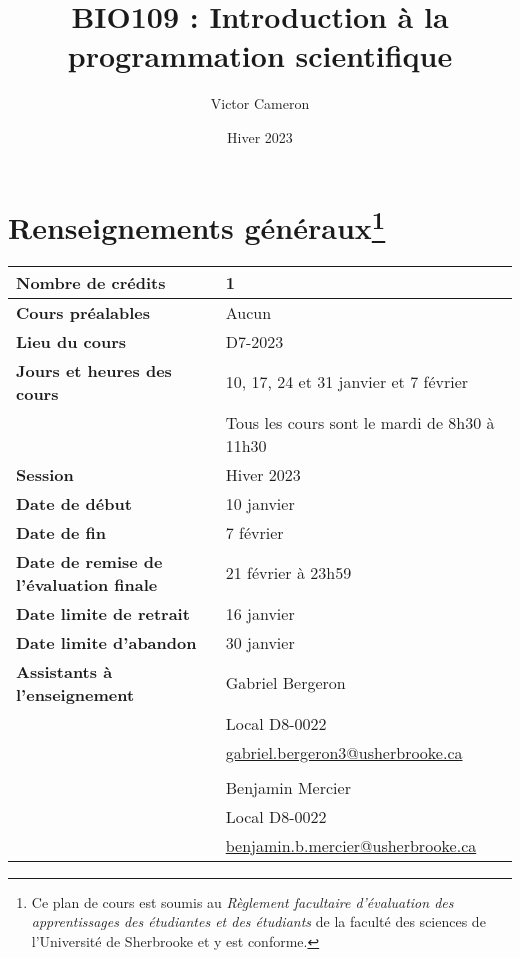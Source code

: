 \documentclass[12]{article}
\title{BIO109 : Introduction à la programmation scientifique}
\date {Hiver 2023}
\author {Victor Cameron}
\affil {Département de biologie \\
Université de Sherbrooke \\
Local D8-0012 \\
819-821-8000 \#61928}
\affil {\url{victor.cameron@usherbrooke.ca}}
\begin{document}
	\maketitle

	\section*{Renseignements généraux\footnote{Ce plan de cours est soumis au \textit{Règlement facultaire d'évaluation des apprentissages des étudiantes et des étudiants} de la faculté des sciences de l'Université de Sherbrooke et y est conforme.}} 
        
        \begin{center}
        \begin{tabular}{ m{22em} m{24em} } 
         \hline
         \hline
         \textbf{Nombre de crédits} & 1 \\ 
         \hline
         \textbf{Cours préalables} & Aucun \\
         \hline
         \textbf{Lieu du cours} & D7-2023 \\
         \hline
         \textbf{Jours et heures des cours} & 10, 17, 24 et 31 janvier et 7 février \\ & Tous les cours sont le mardi de 8h30 à 11h30 \\
         \hline
         \textbf{Session} & Hiver 2023 \\
         \hline
         \textbf{Date de début} & 10 janvier \\
         \hline
         \textbf{Date de fin} & 7 février \\
         \hline
         \textbf{Date de remise de l'évaluation finale} & 21 février à 23h59 \\
         \hline
         \textbf{Date limite de retrait} & 16 janvier \\
         \hline
         \textbf{Date limite d'abandon} & 30 janvier \\
         \hline
         \textbf{Assistants à l'enseignement} & Gabriel Bergeron \\ & Local D8-0022 \\ & \url{gabriel.bergeron3@usherbrooke.ca} \\ &
         \\ & Benjamin Mercier \\ & Local D8-0022 \\ & \url{benjamin.b.mercier@usherbrooke.ca} \\
         \hline
         \hline
        \end{tabular}
        \end{center}
	
\end{document}
